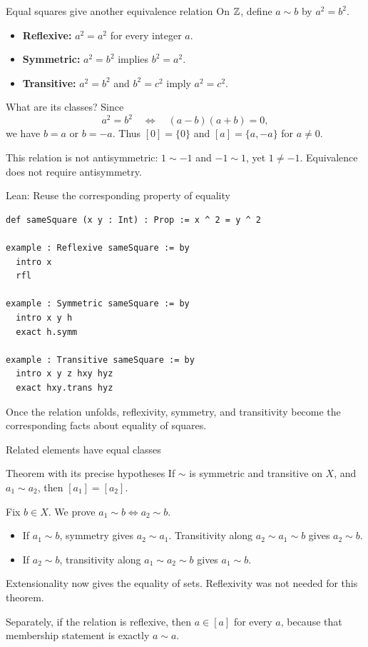 \begin{frame}{Equal squares give another equivalence relation}
On $\mathbb{Z}$, define $a\sim b$ by $a^2=b^2$.
\begin{itemize}
\item \textbf{Reflexive:} $a^2=a^2$ for every integer $a$.
\item \textbf{Symmetric:} $a^2=b^2$ implies $b^2=a^2$.
\item \textbf{Transitive:} $a^2=b^2$ and $b^2=c^2$ imply $a^2=c^2$.
\end{itemize}
What are its classes? Since
\[
 a^2=b^2\quad\Longleftrightarrow\quad(a-b)(a+b)=0,
\]
we have $b=a$ or $b=-a$. Thus $[0]=\{0\}$ and $[a]=\{a,-a\}$ for $a\ne0$.
\medskip

This relation is not antisymmetric: $1\sim-1$ and $-1\sim1$, yet $1\ne-1$.
Equivalence does not require antisymmetry.
\end{frame}

\begin{frame}[fragile]{Lean: Reuse the corresponding property of equality}
\begin{lstlisting}
def sameSquare (x y : Int) : Prop := x ^ 2 = y ^ 2

example : Reflexive sameSquare := by
  intro x
  rfl

example : Symmetric sameSquare := by
  intro x y h
  exact h.symm

example : Transitive sameSquare := by
  intro x y z hxy hyz
  exact hxy.trans hyz
\end{lstlisting}
Once the relation unfolds, reflexivity, symmetry, and transitivity become the corresponding
facts about equality of squares.
\end{frame}

\begin{frame}{Related elements have equal classes}
\begin{block}{Theorem with its precise hypotheses}
If $\sim$ is symmetric and transitive on $X$, and $a_1\sim a_2$,
then $[a_1]=[a_2]$.
\end{block}
Fix $b\in X$. We prove $a_1\sim b\iff a_2\sim b$.
\begin{itemize}
\item If $a_1\sim b$, symmetry gives $a_2\sim a_1$.
Transitivity along $a_2\sim a_1\sim b$ gives $a_2\sim b$.
\item If $a_2\sim b$, transitivity along $a_1\sim a_2\sim b$ gives $a_1\sim b$.
\end{itemize}
Extensionality now gives the equality of sets. Reflexivity was not needed for this theorem.
\medskip

Separately, if the relation is reflexive, then $a\in[a]$ for every $a$,
because that membership statement is exactly $a\sim a$.
\end{frame}

